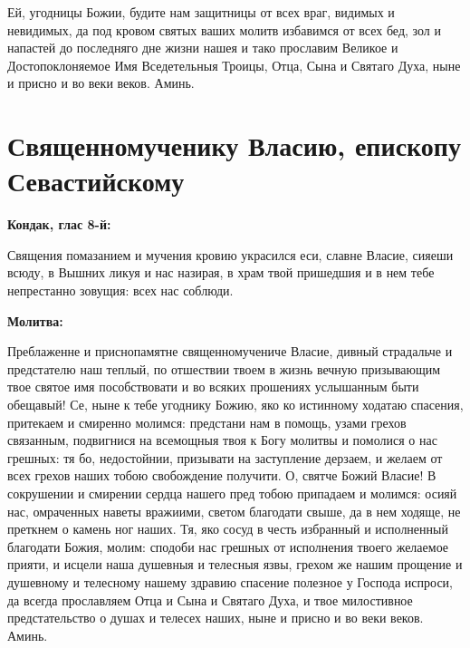 Ей, угодницы Божии, будите нам защитницы от всех враг, видимых и невидимых, да под кровом святых ваших молитв избавимся от всех бед, зол и напастей до последняго дне жизни нашея и тако прославим Великое и Достопоклоняемое Имя Вседетельныя Троицы, Отца, Сына и Святаго Духа, ныне и присно и во веки веков. Аминь.


\bigskip\bigskip\mychapterending


 

\section{Священномученику Власию, епископу Севастийскому}
 

\bfseries Кондак, глас 8-й:\normalfont{}


Священия помазанием и мучения кровию украсился еси, славне Власие, сияеши всюду, в Вышних ликуя и нас назирая, в храм твой пришедшия и в нем тебе непрестанно зовущия: всех нас соблюди.


\medskip


\bfseries Молитва:\normalfont{}


Преблаженне и приснопамятне священномучениче Власие, дивный страдальче и предстателю наш теплый, по отшествии твоем в жизнь вечную призывающим твое святое имя пособствовати и во всяких прошениях услышанным быти обещавый! Се, ныне к тебе угоднику Божию, яко ко истинному ходатаю спасения, притекаем и смиренно молимся: предстани нам в помощь, узами грехов связанным, подвигнися на всемощныя твоя к Богу молитвы и помолися о нас грешных: тя бо, недостойнии, призывати на заступление дерзаем, и желаем от всех грехов наших тобою свобождение получити. О, святче Божий Власие! В сокрушении и смирении сердца нашего пред тобою припадаем и молимся: осияй нас, омраченных наветы вражиими, светом благодати свыше, да в нем ходяще, не преткнем о камень ног наших. Тя, яко сосуд в честь избранный и исполненный благодати Божия, молим: сподоби нас грешных от исполнения твоего желаемое прияти, и исцели наша душевныя и телесныя язвы, грехом же нашим прощение и душевному и телесному нашему здравию спасение полезное у Господа испроси, да всегда прославляем Отца и Сына и Святаго Духа, и твое милостивное предстательство о душах и телесех наших, ныне и присно и во веки веков. Аминь.


\bigskip\bigskip\mychapterending
